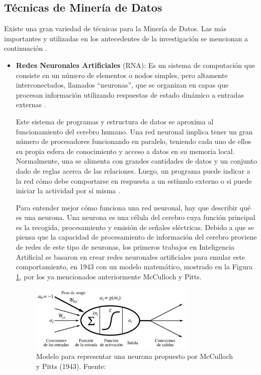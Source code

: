 \clearpage

\subsection{Técnicas de Minería de Datos}

Existe una gran variedad de técnicas para la Minería de Datos. Las más importantes y utilizadas en los antecedentes de la investigación se mencionan a continuación \parencite{gl_microsoft2018datamining}.

\begin{itemize}
	\item \textbf{Redes Neuronales Artificiales} (RNA): Es un sistema de computación que consiste en un número de elementos o nodos simples, pero altamente interconectados, llamados “neuronas”, que se organizan en capas que procesan información utilizando respuestas de estado dinámico a entradas externas \parencite{tec_inzaugarat2018ann}.
	
	Este sistema de programas y estructura de datos se aproxima al funcionamiento del cerebro humano. Una red neuronal implica tener un gran número de procesadores funcionando en paralelo, teniendo cada uno de ellos su propia esfera de conocimiento y acceso a datos en su memoria local. Normalmente, una se alimenta con grandes cantidades de datos y un conjunto dado de reglas acerca de las relaciones. Luego, un programa puede indicar a la red cómo debe comportarse en respuesta a un estímulo externo o si puede iniciar la actividad por sí misma \parencite{tec_banafa2019deeplearning}.
	
	Para entender mejor cómo funciona una red neuronal, hay que describir qué es una neurona. Una neurona es una célula del cerebro cuya función principal es la recogida, procesamiento y emisión de señales eléctricas. Debido a que se piensa que la capacidad de procesamiento de información del cerebro proviene de redes de este tipo de neuronas, los primeros trabajos en Inteligencia Artificial se basaron en crear redes neuronales artificiales para emular este comportamiento, en 1943 con un modelo matemático, mostrado en la Figura \ref{2:fig10}, por los ya mencionados anteriormente McCulloch y Pitts.
	\begin{figure}[h]
		\begin{center}
			\includegraphics[width=0.75\textwidth]{2/figures/rnn_mcculloch.jpg}
			\caption{Modelo para representar una neurona propuesto por McCulloch y Pitts (1943). Fuente: \cite{bk_russell2004intart}}
			\label{2:fig10}
		\end{center}
	\end{figure}


\end{itemize}
